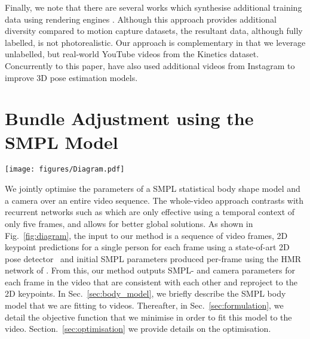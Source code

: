 \documentclass[10pt,twocolumn,letterpaper]{article}
\begin{document}
Finally, we note that there are several works which synthesise additional training data using rendering engines \cite{rogez_ijcv_2018, varol_cvpr_2017, chen_3dv_2016}.
Although this approach provides additional diversity compared to motion capture datasets, the resultant data, although fully labelled, is not photorealistic.
Our approach is complementary in that we leverage unlabelled, but real-world YouTube videos from the Kinetics dataset.
Concurrently to this paper, \cite{kanazawa_cvpr_2019} have also used additional videos from Instagram to improve 3D pose estimation models. \section{Bundle Adjustment using the SMPL Model}
\label{sec:method_single_person}
\begin{figure*}
    \vspace{-\baselineskip}
	\centering
	\texttt{[image: figures/Diagram.pdf]}
	\caption{
	Overview of our method:
	Using initial per-frame estimates of 2D keypoints, SMPL- and camera parameters, we jointly optimise over the whole video comprising  frames by encouraging temporal consistency.
	As a result, we can overcome poor 2D keypoint detection  (first row) and poor initial SMPL estimates (all rows) to output accurate SMPL- and camera-parameters.
}
	\label{fig:diagram}
\end{figure*}
 
We jointly optimise the parameters of a SMPL statistical body shape model \cite{loper_tog_2015} and a camera over an entire video sequence. 
The whole-video approach contrasts with recurrent networks such as \cite{hossain_eccv_2018} which are only effective using a temporal context of only five frames, and allows for better global solutions.
As shown in Fig.~\ref{fig:diagram}, the input to our method is a sequence of video frames, 2D keypoint predictions for a single person for each frame using a state-of-art 2D pose detector~\cite{papandreou_cvpr_2017} and initial SMPL parameters produced per-frame using the HMR network of \cite{kanazawa_cvpr_2018}. 
From this, our method outputs SMPL- and camera parameters for each frame in the video that are consistent with each other and reproject to the 2D keypoints. 
In Sec.~\ref{sec:body_model}, we briefly describe the SMPL body model that we are fitting to videos. 
Thereafter, in Sec.~\ref{sec:formulation}, we detail the objective function that we minimise in order to fit this model to the video. 
Section.~\ref{sec:optimisation} we provide details on the optimisation. 
\end{document}
